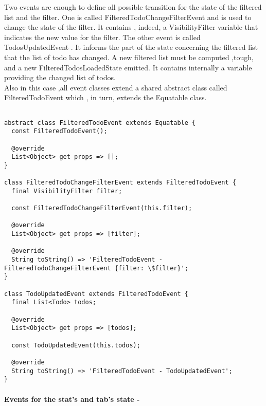 Two events are enough to define all possible transition for the state of the filtered list and the filter. One is called FilteredTodoChangeFilterEvent and is used to change the state of the filter. It contains , indeed, a VisibilityFilter variable  that indicates the new value for the filter. The other event is called TodosUpdatedEvent . It informs the part of the state concerning the filtered list that the list of todo has changed. A new filtered list must be computed ,tough, and a new FilteredTodosLoadedState emitted. It contains internally a variable providing the changed list of todos.\\
Also in this case ,all event classes extend a shared abstract class called FilteredTodoEvent which , in turn, extends the Equatable class. 

\begin{code}
\mbox{}
 \mbox{}
\label{code:2.14}
\begin{verbatim}

abstract class FilteredTodoEvent extends Equatable {
  const FilteredTodoEvent();

  @override
  List<Object> get props => [];
}

class FilteredTodoChangeFilterEvent extends FilteredTodoEvent {
  final VisibilityFilter filter;

  const FilteredTodoChangeFilterEvent(this.filter);

  @override
  List<Object> get props => [filter];

  @override
  String toString() => 'FilteredTodoEvent - FilteredTodoChangeFilterEvent {filter: \$filter}';
}

class TodoUpdatedEvent extends FilteredTodoEvent {
  final List<Todo> todos;

  @override
  List<Object> get props => [todos];

  const TodoUpdatedEvent(this.todos);

  @override
  String toString() => 'FilteredTodoEvent - TodoUpdatedEvent';
}
\end{verbatim}
\mbox{}
\end{code}


\paragraph{Events for the stat’s and tab’s state - }
\label{subpar:todo_app_bloc_core_state}

